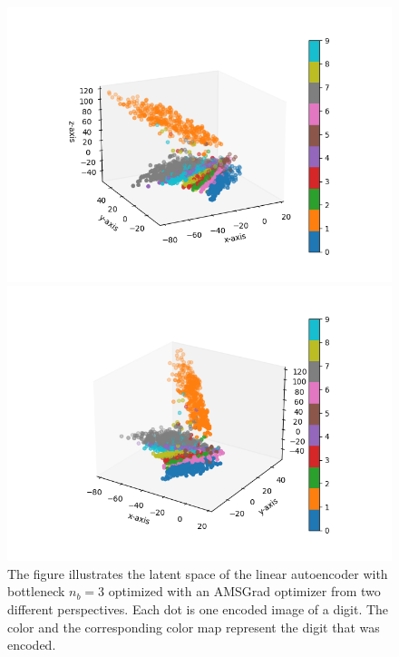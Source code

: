 \begin{figure}
\begin{center}
   \begin{minipage}[b]{0.49\linewidth}
      \includegraphics[trim = 20mm 10mm 20mm 10mm, clip, width=\linewidth]{linear_AE_3d_amsgrad_latent_1}
	\end{minipage}
   \begin{minipage}[b]{0.49\linewidth}
      \includegraphics[trim = 20mm 10mm 20mm 10mm, clip, width=\linewidth]{linear_AE_3d_amsgrad_latent_2}
	\end{minipage}
\end{center}
\caption{The figure illustrates the latent space of the linear autoencoder with bottleneck $n_b=3$ optimized with an AMSGrad optimizer from two different perspectives. Each dot is one encoded image of a digit. The color and the corresponding color map represent the digit that was encoded.}\label{fig:linear_AE_3d_amsgrad_latent}
\end{figure}

